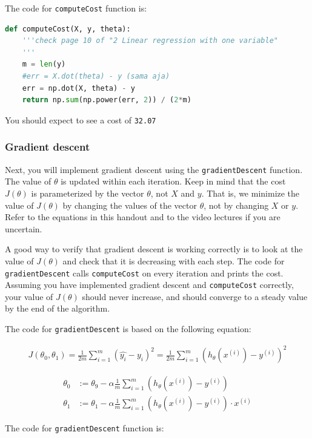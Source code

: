 \documentclass[12pt]{article}
\begin{document}
The code for \texttt{computeCost} function is:

\begin{lstlisting}[language=Python]
def computeCost(X, y, theta):
    '''check page 10 of "2 Linear regression with one variable"
    '''
    m = len(y)
    #err = X.dot(theta) - y (sama aja)
    err = np.dot(X, theta) - y
    return np.sum(np.power(err, 2)) / (2*m)
\end{lstlisting}

You should expect to see a cost of \texttt{32.07}

\subsubsection{Gradient descent}
Next, you will implement gradient descent using the \texttt{gradientDescent} function. The value of $\theta$ is updated within each iteration. Keep in mind that the cost $J(\theta)$ is parameterized by the vector $\theta$, not $X$ and $y$. That is, we minimize the value of $J(\theta)$ by changing the values of the vector $\theta$, not by changing $X$ or $y$. Refer to the equations in this handout and to the video lectures if you are uncertain.

A good way to verify that gradient descent is working correctly is to look at the value of $J(\theta)$ and check that it is decreasing with each step. The code for \texttt{gradientDescent} calls \texttt{computeCost} on every iteration and prints the cost. Assuming you have implemented gradient descent and \texttt{computeCost} correctly, your value of $J(\theta)$ should never increase, and should converge to a steady value by the end of the algorithm.

The code for \texttt{gradientDescent} is based on the following equation:

\begin{align}
    J(\theta_0, \theta_1) = \frac{1}{2m}\sum_{i=1}^m{(\hat{y_i}-y_i)^2} = \frac{1}{2m}\sum_{i=1}^m{(h_\theta(x^{(i)})-y^{(i)})^2}
\end{align}

\begin{align}
  \theta_0 & := \theta_9 - \alpha\frac{1}{m}\sum_{i=1}^m{(h_\theta(x^{(i)})-y^{(i)})}\\
  \theta_1 & := \theta_1 - \alpha\frac{1}{m}\sum_{i=1}^m{(h_\theta(x^{(i)})-y^{(i)})}\cdot x^{(i)}
\end{align}

The code for \texttt{gradientDescent} function is:
\end{document}
